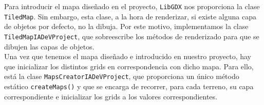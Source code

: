 Para introducir el mapa diseñado en el proyecto, \texttt{LibGDX} nos proporciona la clase \texttt{TiledMap}. Sin embargo, esta clase, a la hora de renderizar, si existe alguna capa de objetos por defecto, no la dibuja. Por este motivo, implementamos la clase \texttt{TiledMapIADeVProject}, que sobreescribe los métodos de renderizado para que se dibujen las capas de objetos. \\

Una vez que tenemos el mapa diseñado e introducido en nuestro proyecto, hay que inicializar los distintos grids en correspondencia con dicho mapa. Para ello, está la clase \texttt{MapsCreatorIADeVProject}, que proporciona un único método estático \texttt{createMaps()} y que se encarga de recorrer, para cada terreno, su capa correspondiente e inicializar los grids a los valores correspondientes.


























